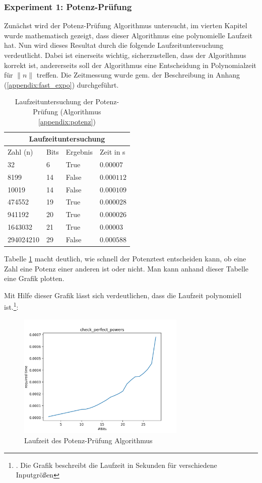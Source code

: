 \documentclass[12pt,oneside]{article}
\theoremstyle{remark}
\theoremstyle{definition}
\begin{document}
\subsubsection{Experiment 1: Potenz-Prüfung}
Zunächst wird der Potenz-Prüfung Algorithmus untersucht, im vierten Kapitel wurde mathematisch gezeigt, dass dieser Algorithmus eine polynomielle Laufzeit hat. Nun wird dieses Resultat durch die folgende Laufzeituntersuchung verdeutlicht. Dabei ist einerseits wichtig, sicherzustellen, dass der Algorithmus korrekt ist, andererseits soll der Algorithmus eine Entscheidung in Polynomialzeit für $\lVert n \rVert$ treffen.
\newpage
Die Zeitmessung wurde gem. der Beschreibung in Anhang (\ref{appendix:fast_expo}) durchgeführt. 
\begin{table}[h!]
\centering
\begin{tabular}{ |p{3cm}||p{3cm}|p{3cm}|p{3cm}|  }
 \hline
 \multicolumn{4}{|c|}{Laufzeituntersuchung} \\
 \hline
 Zahl (n)& Bits &Ergebnis&Zeit in s\\
 \hline
 32   & 6    &True&   $0.00007$\\
 8199&   14  & False   &$0.000112$\\
 10019 &14 & False&  $0.000109$\\
 474552    &19 & True&  $0.000028$\\
 941192&   20  & True&$0.000026$\\
 1643032& 21  & True   &$0.00003$\\
 294024210& 29  & False&$0.000588$\\
 \hline
\end{tabular}
 \caption{Laufzeituntersuchung der Potenz-Prüfung (Algorithmus \ref{appendix:potenz})}
\label{table:1}
\end{table}


Tabelle \ref{table:1} macht deutlich, wie schnell der Potenztest entscheiden kann, ob eine Zahl eine Potenz einer anderen ist oder nicht. Man kann anhand dieser Tabelle eine Grafik plotten. 

Mit Hilfe dieser Grafik lässt sich verdeutlichen, dass die Laufzeit polynomiell ist.\footnote{. Die Grafik beschreibt die Laufzeit in Sekunden für verschiedene Inputgrößen}:
\begin{figure}[h]
\includegraphics[width=8cm]{plots/pp.png}
\centering
\caption{Laufzeit des Potenz-Prüfung Algorithmus}
\end{figure}
\end{document}
